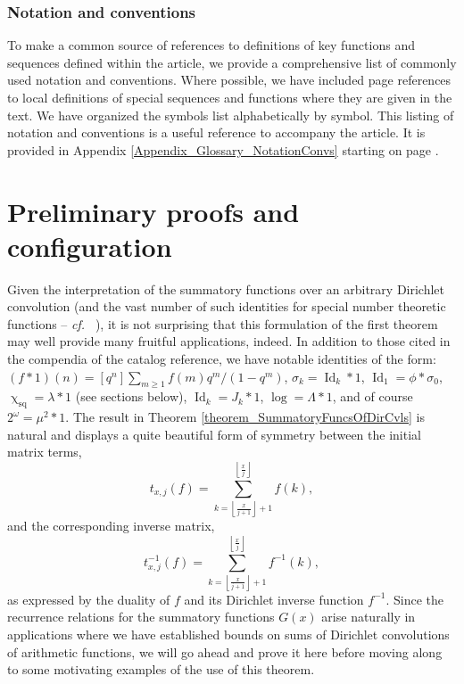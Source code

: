 \documentclass[11pt,reqno,a4letter]{article}
\numberwithin{figure}{section}
\numberwithin{table}{section}
\newcommand{\cf}{\textit{cf.\ }}
\newcommand{\floor}[1]{\left\lfloor #1 \right\rfloor}
\renewcommand{\chi}{\upchi}
\theoremstyle{plain}
\numberwithin{theorem}{section}
\theoremstyle{definition}
\begin{document}
\subsubsection{Notation and conventions} 
\label{Section_Glossary_NotationConvs} 

To make a common source of references to definitions of key functions and sequences defined within the article, 
we provide a comprehensive list of commonly used notation and conventions. 
Where possible, we have included page references to local definitions of special 
sequences and functions where they are given in the text. We have organized the symbols list alphabetically by symbol. This listing of notation and conventions is a useful reference to accompany the article. 
It is provided in Appendix \ref{Appendix_Glossary_NotationConvs} starting on page 
\pageref{Appendix_Glossary_NotationConvs}. 

\newpage 
\section{Preliminary proofs and configuration} 

Given the interpretation of the summatory functions over an arbitrary Dirichlet convolution 
(and the vast number of such identities for special number theoretic functions -- \cf 
\cite{CATALOG-INTDIRSERIES,CATALOG-LAMBERTSERIES}), it is not surprising that this formulation of the first theorem 
may well provide many fruitful applications, indeed. In addition to those cited in the 
compendia of the catalog reference, we have notable identities of the form: 
$(f \ast 1)(n) = [q^n] \sum_{m \geq 1} f(m) q^m / (1-q^m)$, 
$\sigma_k = \operatorname{Id}_k \ast 1$, $\operatorname{Id}_1 = \phi \ast \sigma_0$, 
$\chi_{\operatorname{sq}} = \lambda \ast 1$ (see sections below), 
$\operatorname{Id}_k = J_k \ast 1$, $\log = \Lambda \ast 1$, and of course 
$2^{\omega} = \mu^2 \ast 1$. 
The result in Theorem \ref{theorem_SummatoryFuncsOfDirCvls} is 
natural and displays a quite beautiful form of symmetry between the 
initial matrix terms, $$t_{x,j}(f) = \sum_{k=\floor{\frac{x}{j+1}}+1}^{\floor{\frac{x}{j}}} f(k),$$ and the 
corresponding inverse matrix, $$t_{x,j}^{-1}(f) = \sum_{k=\floor{\frac{x}{j+1}}+1}^{\floor{\frac{x}{j}}} f^{-1}(k),$$ 
as expressed by the duality of $f$ and its Dirichlet inverse function $f^{-1}$. Since the recurrence relations for the 
summatory functions $G(x)$ arise naturally in applications where we have established bounds on sums of 
Dirichlet convolutions of arithmetic functions, we will go ahead and prove it here before moving along to some 
motivating examples of the use of this theorem. 
\end{document}
